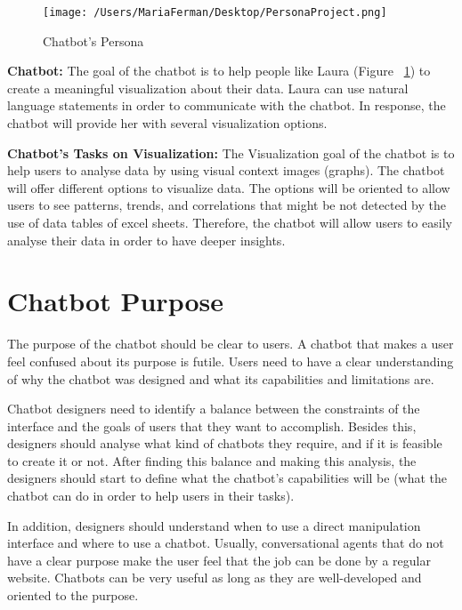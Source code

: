 \documentclass[a4paper,10pt]{article}
\begin{document}
\begin{figure}
\centering
\texttt{[image: /Users/MariaFerman/Desktop/PersonaProject.png]}
\caption{Chatbot's Persona}
\label{FigureLaura}
\end{figure}

\textbf{Chatbot:} The goal of the chatbot is to help people like Laura (Figure ~\ref{FigureLaura}) to create a meaningful visualization about their data. Laura can use natural language statements in order to communicate with the chatbot. In response, the chatbot will provide her with several visualization options.

\textbf{Chatbot's Tasks on Visualization:} The Visualization goal of the chatbot is to help users to analyse data by using visual context images (graphs). The chatbot will offer different options to visualize data. The options will be oriented to allow users to see patterns, trends, and correlations that might be not detected by the use of data tables of excel sheets. Therefore, the chatbot will allow users to easily analyse their data in order to have deeper insights.  

\section{Chatbot Purpose}

The purpose of the chatbot should be clear to users. A chatbot that makes a user feel confused about its purpose is futile. Users need to have a clear understanding of why the chatbot was designed and what its capabilities and limitations are.

Chatbot designers need to identify a balance between the constraints of the interface and the goals of users that they want to accomplish. Besides this, designers should analyse what kind of chatbots they require, and if it is feasible to create it or not. After finding this balance and making this analysis, the designers should start to define what the chatbot's capabilities will be (what the chatbot can do in order to help users in their tasks). 

In addition, designers should understand when to use a direct manipulation interface and where to use a chatbot. Usually, conversational agents that do not have a clear purpose make the user feel that the job can be done by a regular website. Chatbots can be very useful as long as they are well-developed and oriented to the purpose. %
\end{document}
